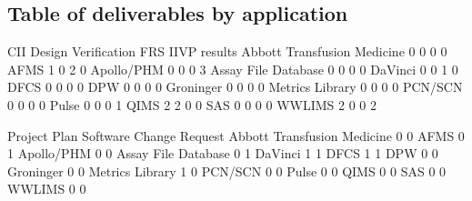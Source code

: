 \documentclass{article}
\begin{document}
\subsection{Table of deliverables by application}
\begin{Schunk}
\begin{Soutput}
                              CII Design Verification FRS IIVP results
  Abbott Transfusion Medicine   0                   0   0            0
  AFMS                          1                   0   2            0
  Apollo/PHM                    0                   0   0            3
  Assay File Database           0                   0   0            0
  DaVinci                       0                   0   1            0
  DFCS                          0                   0   0            0
  DPW                           0                   0   0            0
  Groninger                     0                   0   0            0
  Metrics Library               0                   0   0            0
  PCN/SCN                       0                   0   0            0
  Pulse                         0                   0   0            1
  QIMS                          2                   2   0            0
  SAS                           0                   0   0            0
  WWLIMS                        2                   0   0            2
                             
                              Project Plan Software Change Request
  Abbott Transfusion Medicine            0                       0
  AFMS                                   0                       1
  Apollo/PHM                             0                       0
  Assay File Database                    0                       1
  DaVinci                                1                       1
  DFCS                                   1                       1
  DPW                                    0                       0
  Groninger                              0                       0
  Metrics Library                        1                       0
  PCN/SCN                                0                       0
  Pulse                                  0                       0
  QIMS                                   0                       0
  SAS                                    0                       0
  WWLIMS                                 0                       0
                             

\end{Soutput}
\end{Schunk}
\end{document}
